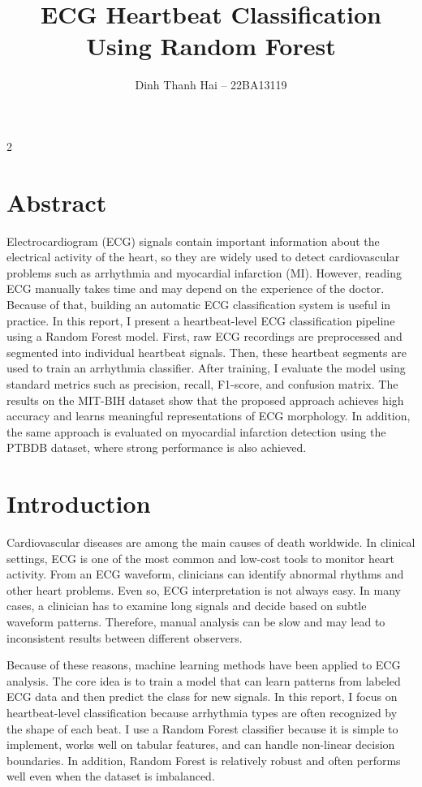 \documentclass[10pt,a4paper]{article}
\title{\textbf{ECG Heartbeat Classification Using Random Forest}}
\author{Dinh Thanh Hai -- 22BA13119}
\date{}
\begin{document}
\maketitle

\begin{multicols}{2}

\section*{Abstract}
Electrocardiogram (ECG) signals contain important information about the electrical activity of the heart, so they are widely used to detect cardiovascular problems such as arrhythmia and myocardial infarction (MI). However, reading ECG manually takes time and may depend on the experience of the doctor. Because of that, building an automatic ECG classification system is useful in practice. In this report, I present a heartbeat-level ECG classification pipeline using a Random Forest model. First, raw ECG recordings are preprocessed and segmented into individual heartbeat signals. Then, these heartbeat segments are used to train an arrhythmia classifier. After training, I evaluate the model using standard metrics such as precision, recall, F1-score, and confusion matrix. The results on the MIT-BIH dataset show that the proposed approach achieves high accuracy and learns meaningful representations of ECG morphology. In addition, the same approach is evaluated on myocardial infarction detection using the PTBDB dataset, where strong performance is also achieved.

\section{Introduction}
Cardiovascular diseases are among the main causes of death worldwide. In clinical settings, ECG is one of the most common and low-cost tools to monitor heart activity. From an ECG waveform, clinicians can identify abnormal rhythms and other heart problems. Even so, ECG interpretation is not always easy. In many cases, a clinician has to examine long signals and decide based on subtle waveform patterns. Therefore, manual analysis can be slow and may lead to inconsistent results between different observers.

Because of these reasons, machine learning methods have been applied to ECG analysis. The core idea is to train a model that can learn patterns from labeled ECG data and then predict the class for new signals. In this report, I focus on heartbeat-level classification because arrhythmia types are often recognized by the shape of each beat. I use a Random Forest classifier because it is simple to implement, works well on tabular features, and can handle non-linear decision boundaries. In addition, Random Forest is relatively robust and often performs well even when the dataset is imbalanced.


\end{multicols}
\end{document}
